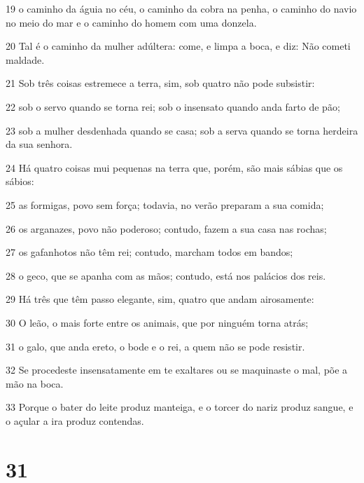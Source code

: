 \par 19 o caminho da águia no céu, o caminho da cobra na penha, o caminho do navio no meio do mar e o caminho do homem com uma donzela.
\par 20 Tal é o caminho da mulher adúltera: come, e limpa a boca, e diz: Não cometi maldade.
\par 21 Sob três coisas estremece a terra, sim, sob quatro não pode subsistir:
\par 22 sob o servo quando se torna rei; sob o insensato quando anda farto de pão;
\par 23 sob a mulher desdenhada quando se casa; sob a serva quando se torna herdeira da sua senhora.
\par 24 Há quatro coisas mui pequenas na terra que, porém, são mais sábias que os sábios:
\par 25 as formigas, povo sem força; todavia, no verão preparam a sua comida;
\par 26 os arganazes, povo não poderoso; contudo, fazem a sua casa nas rochas;
\par 27 os gafanhotos não têm rei; contudo, marcham todos em bandos;
\par 28 o geco, que se apanha com as mãos; contudo, está nos palácios dos reis.
\par 29 Há três que têm passo elegante, sim, quatro que andam airosamente:
\par 30 O leão, o mais forte entre os animais, que por ninguém torna atrás;
\par 31 o galo, que anda ereto, o bode e o rei, a quem não se pode resistir.
\par 32 Se procedeste insensatamente em te exaltares ou se maquinaste o mal, põe a mão na boca.
\par 33 Porque o bater do leite produz manteiga, e o torcer do nariz produz sangue, e o açular a ira produz contendas.

\chapter{31}

